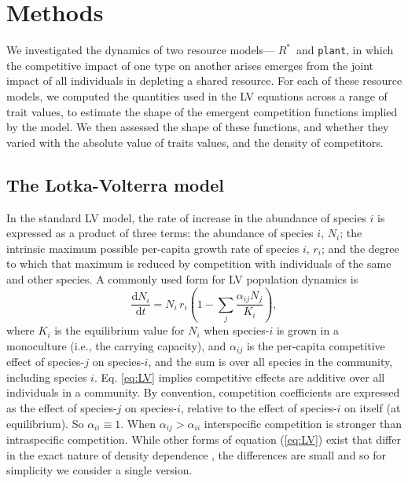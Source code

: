 \documentclass[a4paper,11pt]{article}
\newcommand{\ud}{\ensuremath{\mathrm{d}}}
\newcommand{\Rstar}{\ensuremath{R^*}}
\newcommand{\plant}{{\tt plant}}
\begin{document}
\section{Methods}

We investigated the dynamics of two resource models--- \Rstar\  and \plant, in which the competitive impact of one type on another arises emerges from the joint impact of all individuals in depleting a shared resource. For each of these resource models, we computed the quantities used in the LV equations across a range of trait values, to estimate the shape of the emergent competition functions implied by the model. We then assessed the shape of these functions, and whether they varied with the absolute value of traits values, and the density of competitors.

\subsection{The Lotka-Volterra model}

In the standard LV model, the rate of increase in the abundance of species $i$ is expressed as a product of three terms: the abundance of species $i$, $N_i$; the intrinsic maximum possible per-capita growth rate of species $i$, $r_i$; and the degree to which that maximum is reduced by competition with individuals of the same and other species. A commonly used form for LV population dynamics is 
\begin{equation} \label{eq:LV} 
	\frac{\ud N_i}{\ud t} = N_i\, r_i \left(1 - \sum_j \frac{\alpha_{ij} N_j}{K_i}\right), 
\end{equation}
where $K_i$ is the equilibrium value for $N_i$ when species-$i$ is grown in a monoculture (i.e., the carrying capacity), and $\alpha_{ij}$ is the per-capita competitive effect of species-$j$ on species-$i$, and the sum is over all species in the community, including species $i$. Eq. \ref{eq:LV} implies competitive effects are additive over all individuals in a community. By convention, competition coefficients are expressed as the effect of species-$j$ on species-$i$, relative to the effect of species-$i$ on itself (at equilibrium).  So $\alpha_{ii} \equiv 1$. When $\alpha_{ij} > \alpha_{ii}$ interspecific competition is stronger than intraspecific competition. While other forms of equation (\ref{eq:LV}) exist that differ in the exact nature of density dependence \citep[e.g.][]{Leimar-2013}, the differences are small and so for simplicity we consider a single version.
\end{document}
